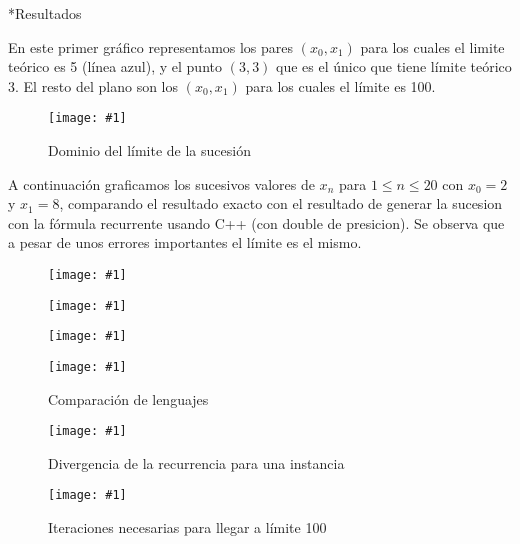 \documentclass[12pt,titlepage]{article}
\newcommand{\gras}[2]{\noindent\texttt{[image: \#1]}\\}
\newenvironment{usection}[1]{\newpage\begin{section}*{#1}	\addcontentsline{toc}{section}{#1}}{\end{section}}
\begin{document}
	\begin{usection}{Resultados}

		En este primer gráfico representamos los pares $(x_0,x_1)$ para los cuales el limite teórico es 5 (línea azul),
		y el punto $(3,3)$ que es el único que tiene límite teórico 3.
		El resto del plano son los $(x_0,x_1)$ para los cuales el límite es 100.
		
		\begin{figure}[H]
			\centering
			\caption{Dominio del límite de la sucesión}
			\label{fig:dominio}
				\gras{lim5.png}{.6}
		\end{figure}

		A continuación graficamos los sucesivos valores de $x_n$ para $1\leq n\leq 20$ con $x_0=2$ y $x_1=8$, comparando el resultado exacto con el resultado de generar la sucesion con la fórmula recurrente usando C++ (con double de presicion).
		Se observa que a pesar de unos errores importantes el límite es el mismo.

		\begin{figure}[H]
			\centering
				\gras{fig_2_8_20.png}{.6}
		\end{figure}

		\begin{figure}[H]
			\centering
				\gras{fig_4_4-25_20.png}{.6}
		\end{figure}

		\begin{figure}[H]
			\centering
				\gras{fig_4_4-25_10.png}{.6}
		\end{figure}

		\begin{figure}[H]
			\centering
			\caption{Comparación de lenguajes}
			\label{fig:comparaciones}
				\gras{fig_comparaciones.png}{.6}
		\end{figure}

		\begin{figure}[H]
			\centering
			\caption{Divergencia de la recurrencia para una instancia}
			\label{fig:divergencia}
				\gras{fig_divergencia.png}{.6}
		\end{figure}

		\begin{figure}[H]
			\centering
			\caption{Iteraciones necesarias para llegar a límite 100}
			\label{fig:iteraciones}
				\gras{fig_iteraciones.png}{.3}
		\end{figure}

	\end{usection}
	
\end{document}
